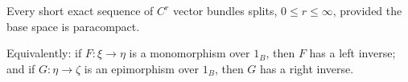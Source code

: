 Every short exact sequence of $C^r$ vector bundles splits, $0 \leqslant r \leqslant \infty$, provided the base space is paracompact.

Equivalently: if $F: \xi \to \eta$ is a monomorphism over $1_B$, then $F$ has a left inverse; and if $G: \eta \to \zeta$ is an epimorphism over $1_B$, then $G$ has a right inverse.
